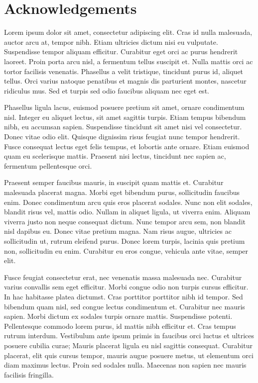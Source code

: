 \documentclass[
]{article}
\begin{document}
\clearpage

\section*{Acknowledgements}

Lorem ipsum dolor sit amet, consectetur adipiscing elit. Cras id nulla malesuada, auctor arcu at, tempor nibh. Etiam ultricies dictum nisi eu vulputate. Suspendisse tempor aliquam efficitur. Curabitur eget orci ac purus hendrerit laoreet. Proin porta arcu nisl, a fermentum tellus suscipit et. Nulla mattis orci ac tortor facilisis venenatis. Phasellus a velit tristique, tincidunt purus id, aliquet tellus. Orci varius natoque penatibus et magnis dis parturient montes, nascetur ridiculus mus. Sed et turpis sed odio faucibus aliquam nec eget est.

Phasellus ligula lacus, euismod posuere pretium sit amet, ornare condimentum nisl. Integer eu aliquet lectus, sit amet sagittis turpis. Etiam tempus bibendum nibh, eu accumsan sapien. Suspendisse tincidunt sit amet nisi vel consectetur. Donec vitae odio elit. Quisque dignissim risus feugiat nunc tempor hendrerit. Fusce consequat lectus eget felis tempus, et lobortis ante ornare. Etiam euismod quam eu scelerisque mattis. Praesent nisi lectus, tincidunt nec sapien ac, fermentum pellentesque orci.

Praesent semper faucibus mauris, in suscipit quam mattis et. Curabitur malesuada placerat magna. Morbi eget bibendum purus, sollicitudin faucibus enim. Donec condimentum arcu quis eros placerat sodales. Nunc non elit sodales, blandit risus vel, mattis odio. Nullam in aliquet ligula, ut viverra enim. Aliquam viverra justo non neque consequat dictum. Nunc tempor arcu sem, non blandit nisl dapibus eu. Donec vitae pretium magna. Nam risus augue, ultricies ac sollicitudin ut, rutrum eleifend purus. Donec lorem turpis, lacinia quis pretium non, sollicitudin eu enim. Curabitur eu eros congue, vehicula ante vitae, semper elit.

Fusce feugiat consectetur erat, nec venenatis massa malesuada nec. Curabitur varius convallis sem eget efficitur. Morbi congue odio non turpis cursus efficitur. In hac habitasse platea dictumst. Cras porttitor porttitor nibh id tempor. Sed bibendum quam nisl, sed congue lectus condimentum et. Curabitur nec mauris sapien. Morbi dictum ex sodales turpis ornare mattis. Suspendisse potenti. Pellentesque commodo lorem purus, id mattis nibh efficitur et. Cras tempus rutrum interdum. Vestibulum ante ipsum primis in faucibus orci luctus et ultrices posuere cubilia curae; Mauris placerat ligula eu nisl sagittis consequat. Curabitur placerat, elit quis cursus tempor, mauris augue posuere metus, ut elementum orci diam maximus lectus. Proin sed sodales nulla. Maecenas non sapien nec mauris facilisis fringilla.
\end{document}
